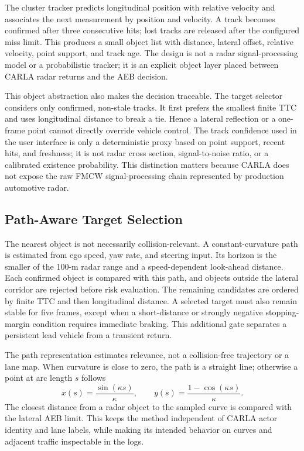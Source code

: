 \documentclass[conference]{IEEEtran}
\begin{document}
The cluster tracker predicts longitudinal position with relative velocity and
associates the next measurement by position and velocity. A track becomes
confirmed after three consecutive hits; lost tracks are released after the
configured miss limit. This produces a small object list with distance, lateral
offset, relative velocity, point support, and track age. The design is not a
radar signal-processing model or a probabilistic tracker; it is an explicit
object layer placed between CARLA radar returns and the AEB decision.

This object abstraction also makes the decision traceable. The target selector
considers only confirmed, non-stale tracks. It first prefers the smallest finite
TTC and uses longitudinal distance to break a tie. Hence a lateral reflection or
a one-frame point cannot directly override vehicle control. The track confidence
used in the user interface is only a deterministic proxy based on point support,
recent hits, and freshness; it is not radar cross section, signal-to-noise ratio,
or a calibrated existence probability. This distinction matters because CARLA
does not expose the raw FMCW signal-processing chain represented by production
automotive radar.

\subsection{Path-Aware Target Selection}
The nearest object is not necessarily collision-relevant. A constant-curvature
path is estimated from ego speed, yaw rate, and steering input. Its horizon is
the smaller of the 100-m radar range and a speed-dependent look-ahead distance.
Each confirmed object is compared with this path, and objects outside the
lateral corridor are rejected before risk evaluation. The remaining candidates
are ordered by finite TTC and then longitudinal distance. A selected target must
also remain stable for five frames, except when a short-distance or strongly
negative stopping-margin condition requires immediate braking. This additional
gate separates a persistent lead vehicle from a transient return.

The path representation estimates relevance, not a collision-free trajectory or
a lane map. When curvature is close to zero, the path is a straight line;
otherwise a point at arc length $s$ follows
\begin{equation}
x(s)=\frac{\sin(\kappa s)}{\kappa},\qquad
y(s)=\frac{1-\cos(\kappa s)}{\kappa}.
\label{eq:path}
\end{equation}
The closest distance from a radar object to the sampled curve is compared with
the lateral AEB limit. This keeps the method independent of CARLA actor identity
and lane labels, while making its intended behavior on curves and adjacent
traffic inspectable in the logs.
\end{document}
